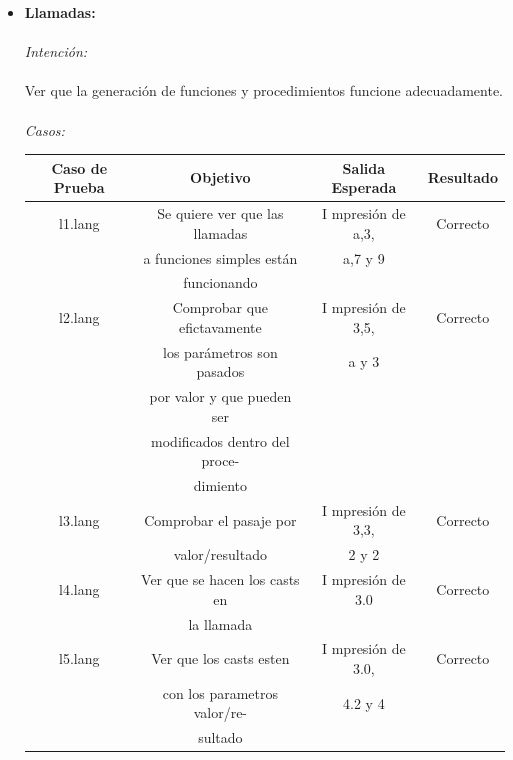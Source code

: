 \documentclass[11pt, spanish]{report}
\begin{document}
\begin{itemize}
\item \textbf{Llamadas:}\\ \\
  \emph{Intenci\'on:}\\ \\
  Ver que la generaci\'on de funciones y procedimientos funcione adecuadamente.\\ \\
  \emph{Casos:}\\ 
  \begin{table}[!hbp]
    \begin{tabular}{c c c c}
      \hline            
      \hline            
      Caso de Prueba & Objetivo                       & Salida Esperada      & Resultado \\ [0.5ex]
      \hline                          
      l1.lang        & Se quiere ver que las llamadas & I mpresi\'on de a,3, & Correcto  \\ [1ex] 
                     & a funciones simples est\'an    & a,7 y 9              &           \\ [1ex] 
                     & funcionando                    &                      &           \\ [1ex] 
      l2.lang        & Comprobar que efictavamente    & I mpresi\'on de 3,5, & Correcto  \\ [1ex] 
                     & los par\'ametros son pasados   & a y 3                &           \\ [1ex] 
                     & por valor y que pueden ser     &                      &           \\ [1ex] 
                     & modificados dentro del proce-  &                      &           \\ [1ex] 
                     & dimiento                       &                      &           \\ [1ex] 
      l3.lang        & Comprobar el pasaje por        & I mpresi\'on de 3,3, & Correcto  \\ [1ex] 
                     & valor/resultado                & 2 y 2                &           \\ [1ex] 
      l4.lang        & Ver que se hacen los casts en  & I mpresi\'on de 3.0  & Correcto  \\ [1ex] 
                     & la llamada                     &                      &           \\ [1ex] 
      l5.lang        & Ver que los casts esten        & I mpresi\'on de 3.0, & Correcto  \\ [1ex] 
                     & con los parametros valor/re-   & 4.2 y 4              &           \\ [1ex] 
                     & sultado                        &                      &           \\ [1ex] 
      \hline
    \end{tabular}    
  \end{table}


\end{itemize}
\end{document}
